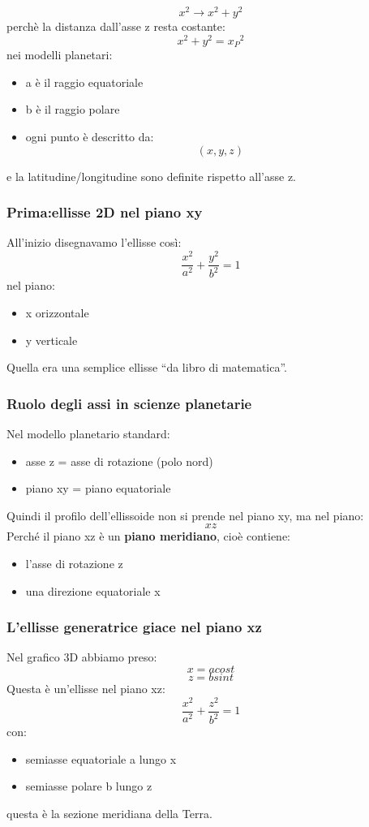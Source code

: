 \documentclass[a4paper,14pt]{article}
\begin{document}
\[x^2 \rightarrow x^2+y^2 \]
perchè la distanza dall'asse z resta costante:
\[ x^2 + y^2 = {x_P}^2 \]
nei modelli planetari:
\begin{itemize}
\item a è il raggio equatoriale
\item b è il raggio polare
\item ogni punto è descritto da:
\[ (x,y,z) \]
\end{itemize}
e la latitudine/longitudine sono definite rispetto all’asse z.
\subsubsection{Prima:ellisse 2D nel piano xy}
All’inizio disegnavamo l’ellisse così:
\[\frac{x^2}{a^2}+\frac{y^2}{b^2}=1\]
nel piano:
\begin{itemize}
\item x orizzontale
\item y verticale
\end{itemize}
Quella era una semplice ellisse “da libro di matematica”.\\
\subsubsection{Ruolo degli assi in scienze planetarie}
Nel modello planetario standard:
\begin{itemize}
\item asse z = asse di rotazione (polo nord)
\item piano xy = piano equatoriale
\end{itemize}

Quindi il profilo dell’ellissoide non si prende nel piano xy, ma nel piano:
\[xz\]
Perché il piano xz è un \textbf{piano meridiano}, cioè contiene:
\begin{itemize}
\item l’asse di rotazione z
\item una direzione equatoriale x
\end{itemize}
\subsubsection{L'ellisse generatrice giace nel piano xz}
Nel grafico 3D abbiamo preso:
\[x=acos⁡t\]
\[z=bsin⁡t\]
Questa è un’ellisse nel piano xz:
\[\frac{x^2}{a^2}+\frac{z^2}{b^2}=1\]
con:
\begin{itemize}
\item semiasse equatoriale a lungo x
\item semiasse polare b lungo z
\end{itemize}
questa è la sezione meridiana della Terra.\\
\end{document}
